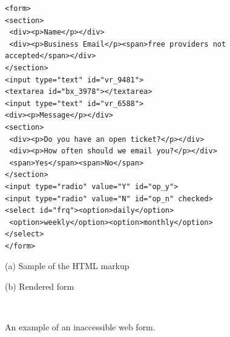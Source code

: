 \begin{figure}
    \noindent
	\begin{minipage}[c]{.97\columnwidth}
        \centering
        \begin{lstlisting}[language={HTML5},frame=ltbr,aboveskip=1.1em,basicstyle={\linespread{1.0}\footnotesize\ttfamily},]
<form>
<section>
 <div><p>Name</p></div>
 <div><p>Business Email</p><span>free providers not accepted</span></div>
</section>
<input type="text" id="vr_9481">
<textarea id="bx_3978"></textarea>
<input type="text" id="vr_6588">
<div><p>Message</p></div>
<section>
 <div><p>Do you have an open ticket?</p></div>
 <div><p>How often should we email you?</p></div>
 <span>Yes</span><span>No</span>
</section>
<input type="radio" value="Y" id="op_y">
<input type="radio" value="N" id="op_n" checked>
<select id="frq"><option>daily</option>
 <option>weekly</option><option>monthly</option>
</select>
</form>
        \end{lstlisting}
    (a) Sample of the HTML markup
    \end{minipage} \hfill
	\begin{minipage}[c]{\columnwidth}
        \centering
        (b) Rendered form
    \end{minipage}
	\ \\ \caption{An example of an inaccessible web form.}
    \label{fig:motivating-example}
  \end{figure}